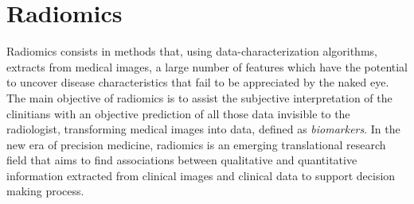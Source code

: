 \documentclass{standalone}
\begin{document}
\section{Radiomics}
Radiomics consists in methods that, using data-characterization algorithms, extracts from medical images, a large number of features which have the potential to uncover disease characteristics that fail to be appreciated by the naked eye\cite{wiki:Radiomics}.
The main objective of radiomics is to assist the subjective interpretation of the clinitians with an objective prediction of all those data invisible to the radiologist, transforming medical images into data, defined as \textit{biomarkers}\cite{tesicoppola}.
In the new era of precision medicine, radiomics is an emerging translational research field that aims to find associations between qualitative and quantitative information extracted from clinical images and clinical data to support decision making process.
\end{document}
